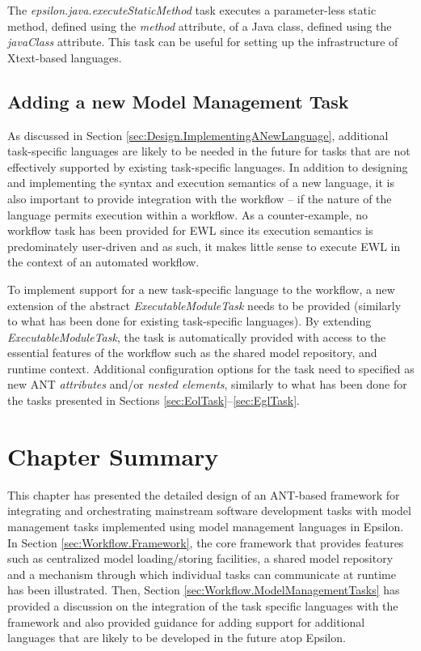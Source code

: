 The \emph{epsilon.java.executeStaticMethod} task executes a parameter-less static method, defined using the \emph{method} attribute, of a Java class, defined using the \emph{javaClass} attribute. This task can be useful for setting up the infrastructure of Xtext-based languages.

\subsection{Adding a new Model Management Task}
\label{sec:Workflow.NewModelManagementTask}

As discussed in Section \ref{sec:Design.ImplementingANewLanguage}, additional task-specific languages are likely to be needed in the future for tasks that are not effectively supported by existing task-specific languages. In addition to designing and implementing the syntax and execution semantics of a new language, it is also important to provide integration with the workflow -- if the nature of the language permits execution within a workflow. As a counter-example, no workflow task has been provided for EWL since its execution semantics is predominately user-driven and as such, it makes little sense to execute EWL in the context of an automated workflow.

To implement support for a new task-specific language to the workflow, a new extension of the abstract \emph{ExecutableModuleTask} needs to be provided (similarly to what has been done for existing task-specific languages). By extending \emph{ExecutableModuleTask}, the task is automatically provided with access to the essential features of the workflow such as the shared model repository, and runtime context. Additional configuration options for the task need to specified as new ANT \emph{attributes} and/or \emph{nested elements}, similarly to what has been done for the tasks presented in Sections \ref{sec:EolTask}--\ref{sec:EglTask}.

\section{Chapter Summary}

This chapter has presented the detailed design of an ANT-based framework for integrating and orchestrating mainstream software development tasks with model management tasks implemented using model management languages in Epsilon. In Section \ref{sec:Workflow.Framework}, the core framework that provides features such as centralized model loading/storing facilities, a shared model repository and a mechanism through which individual tasks can communicate at runtime has been illustrated. Then, Section \ref{sec:Workflow.ModelManagementTasks} has provided a discussion on the integration of the task specific languages with the framework and also provided guidance for adding support for additional languages that are likely to be developed in the future atop Epsilon.